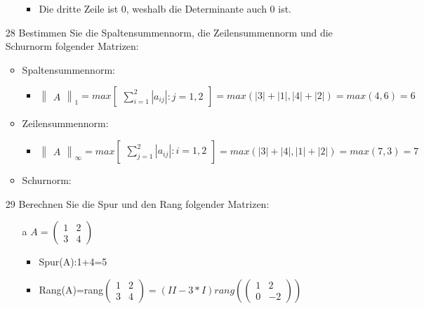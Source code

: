 \documentclass{article}
\begin{document}
\begin{itemize}
\begin{itemize}
			\begin{itemize}
				\item{Die dritte Zeile ist 0, weshalb die Determinante auch 0 ist.}
			\end{itemize}
		\end{itemize}
		\item[28]{Bestimmen Sie die Spaltensummennorm, die Zeilensummennorm und die Schurnorm folgender Matrizen:}
		\begin{itemize}
			\item{Spaltensummennorm:}
			\begin{itemize}
				\item{$\begin{Vmatrix} A \end{Vmatrix}_1=max\begin{bmatrix}\sum_{i=1}^{2}|a_{ij}|:j=1,2\end{bmatrix}=max(|3|+|1|, |4|+|2|)=max(4,6)=6$}
			\end{itemize}
			\item{Zeilensummennorm:}
			\begin{itemize}
				\item{$\begin{Vmatrix} A \end{Vmatrix}_{\infty}=max \begin{bmatrix} \sum_{j=1}^{2} |a_{ij}|:i=1,2 \end{bmatrix}=max(|3|+|4|, |1|+|2|)=max(7,3)=7$}
			\end{itemize}
			\item{Schurnorm:}
		\end{itemize}
		\item[29]{Berechnen Sie die Spur und den Rang folgender Matrizen:}
		\begin{itemize}
			\item[a]{$A=\begin{pmatrix} 1 & 2 \\ 3 & 4 \end{pmatrix}$}
			\begin{itemize}
				\item{Spur(A):1+4=5}
				\item{Rang(A)=rang$\begin{pmatrix} 1 & 2 \\ 3 & 4\end{pmatrix}=(II-3*I)rang(\begin{pmatrix} 1 & 2 \\ 0 & -2 \end{pmatrix})$}

\end{itemize}
\end{itemize}
\end{itemize}
\end{document}
